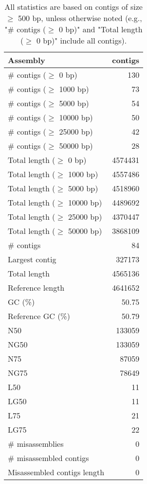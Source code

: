 \documentclass[12pt,a4paper]{article}
\begin{document}
\begin{table}[ht]
\begin{center}
\caption{All statistics are based on contigs of size $\geq$ 500 bp, unless otherwise noted (e.g., "\# contigs ($\geq$ 0 bp)" and "Total length ($\geq$ 0 bp)" include all contigs).}
\begin{tabular}{|l*{1}{|r}|}
\hline
Assembly & contigs \\ \hline
\# contigs ($\geq$ 0 bp) & 130 \\ \hline
\# contigs ($\geq$ 1000 bp) & 73 \\ \hline
\# contigs ($\geq$ 5000 bp) & 54 \\ \hline
\# contigs ($\geq$ 10000 bp) & 50 \\ \hline
\# contigs ($\geq$ 25000 bp) & 42 \\ \hline
\# contigs ($\geq$ 50000 bp) & 28 \\ \hline
Total length ($\geq$ 0 bp) & 4574431 \\ \hline
Total length ($\geq$ 1000 bp) & 4557486 \\ \hline
Total length ($\geq$ 5000 bp) & 4518960 \\ \hline
Total length ($\geq$ 10000 bp) & 4489692 \\ \hline
Total length ($\geq$ 25000 bp) & 4370447 \\ \hline
Total length ($\geq$ 50000 bp) & 3868109 \\ \hline
\# contigs & 84 \\ \hline
Largest contig & 327173 \\ \hline
Total length & 4565136 \\ \hline
Reference length & 4641652 \\ \hline
GC (\%) & 50.75 \\ \hline
Reference GC (\%) & 50.79 \\ \hline
N50 & 133059 \\ \hline
NG50 & 133059 \\ \hline
N75 & 87059 \\ \hline
NG75 & 78649 \\ \hline
L50 & 11 \\ \hline
LG50 & 11 \\ \hline
L75 & 21 \\ \hline
LG75 & 22 \\ \hline
\# misassemblies & 0 \\ \hline
\# misassembled contigs & 0 \\ \hline
Misassembled contigs length & 0 \\ \hline

\end{tabular}
\end{center}
\end{table}
\end{document}
